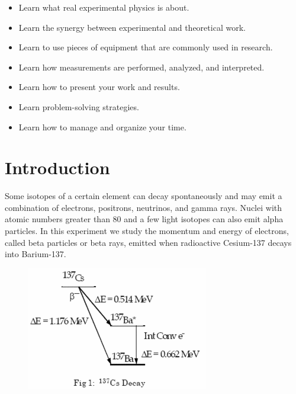 \documentclass{../lab}
\begin{document}
\begin{itemize}
    \item Learn what real experimental physics is about.

    \item Learn the synergy between experimental and theoretical work.

    \item Learn to use pieces of equipment that are commonly used in research.

    \item Learn how measurements are performed, analyzed, and interpreted.

    \item Learn how to present your work and results.

    \item Learn problem-solving strategies.

    \item Learn how to manage and organize your time.
\end{itemize}

\section{Introduction}

Some isotopes of a certain element can decay spontaneously and may emit a combination of electrons, positrons, neutrinos, and gamma rays. Nuclei with atomic numbers greater than 80 and a few light isotopes can also emit alpha particles. In this experiment we study the momentum and energy of electrons, called beta particles or beta rays, emitted when radioactive Cesium-137 decays into Barium-137.

\begin{figure}[h]
    \centering
    \href{http://experimentationlab.berkeley.edu/sites/default/files/images/300px-BRAimage003.gif}{\includegraphics[width=0.5\linewidth]{images/300px-BRAimage003.png}}
    \caption{}
    \label{fig:300px-BRAimage003}
\end{figure}
\end{document}

